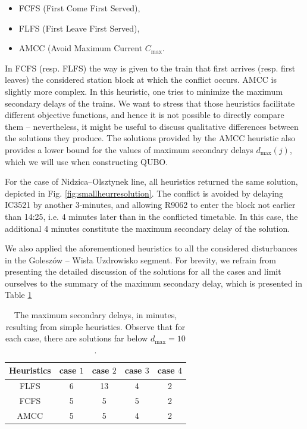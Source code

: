 \begin{itemize}
  \item FCFS (First Come First Served),
  \item FLFS (First Leave First Served),
  \item AMCC (Avoid Maximum Current $C_{\max}$.
\end{itemize}

In FCFS (resp. FLFS) the way is given to the train that first arrives (resp.
first leaves) the considered station block at which the conflict occurs. AMCC
is slightly more complex. In this heuristic, one tries to minimize the maximum
secondary delays of the trains. We want to stress that those heuristics
facilitate different objective functions, and hence it is not possible to
directly compare them -- nevertheless, it might be useful to discuss
qualitative differences between the solutions they produce. The solutions
provided by the AMCC heuristic also provides a lower bound for the values
of maximum secondary delays $d_{\max}(j)$, which we will use when constructing
QUBO.

For the case of Nidzica--Olsztynek line, all heuristics returned the same
solution, depicted in Fig. \ref{fig:smallheurresolution}. The conflict is
avoided by delaying IC3521 by another 3-minutes, and allowing R9062 to enter
the block not earlier than 14:25, i.e. 4 minutes later than in the conflicted
timetable. In this case, the additional 4 minutes constitute the maximum
secondary delay of the solution.

We also applied the aforementioned heuristics to all the considered
disturbances in the Goleszów -- Wisła Uzdrowisko segment. For brevity, we
refrain from presenting the detailed discussion of the solutions for all the
cases and limit ourselves to the summary of the maximum secondary delay, which
is presented in Table \ref{tab:simple}

\begin{table}[bh]
  \centering
  \begin{tabular}{ccccc}
    Heuristics & case $1$ & case $2$ & case $3$ & case $4$ \\
    \hline
    FLFS       & 6        & 13       & 4        & 2        \\
    \hline
    FCFS       & 5        & 5        & 5        & 2        \\
    \hline
    AMCC       & 5        & 5        & 4        & 2        \\
    \hline
  \end{tabular}
  \caption{The maximum secondary delays, in minutes, resulting from simple heuristics.
    Observe that for each case, there are solutions far below $d_{\text{max}} =
      10$.} \label{tab:simple}
\end{table}

